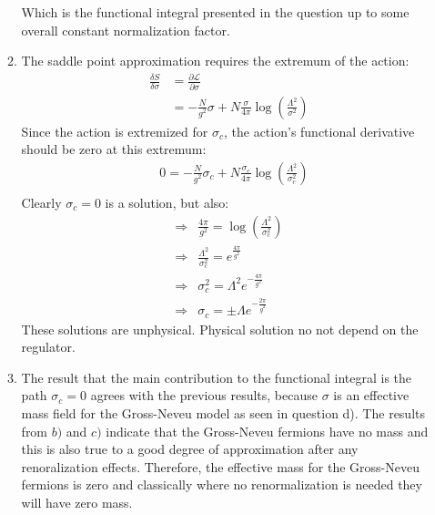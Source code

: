 \documentclass[12pt,a4]{article}
\begin{document}
\begin{enumerate}
\begin{enumerate}
        Which is the functional integral presented in the question up to some overall constant normalization factor.
      \item
        The saddle point approximation requires the extremum of the action:
        \begin{align*}
          \frac{\delta S}{\delta \sigma} &= \frac{\partial \mathcal{L}}{\partial \sigma}\\
                                         &= -\frac{N}{g^2}\sigma + N \frac{\sigma}{4 \pi}\log\left(\frac{\Lambda^2}{\sigma^2}\right)
        \end{align*}
        Since the action is extremized for $\sigma_c$, the action's functional derivative should be zero at this extremum:
        \begin{align*}
                      & 0 = -\frac{N}{g^2}\sigma_c + N \frac{\sigma_c}{4 \pi}\log\left(\frac{\Lambda^2}{\sigma^2_c}\right)\\
        \end{align*}
        Clearly $\sigma_c = 0$ is a solution, but also:
        \begin{align*}
          \Rightarrow & \frac{4 \pi}{g^2} = \log\left(\frac{\Lambda^2}{\sigma^2_c}\right)\\
          \Rightarrow & \frac{\Lambda^2}{\sigma^2_c} = e^{\frac{4 \pi}{g^2}}\\
          \Rightarrow & \sigma^2_c = \Lambda^2 e^{- \frac{4 \pi}{g^2}}\\
          \Rightarrow & \sigma_c = \pm \Lambda e^{- \frac{2 \pi}{g^2}}
        \end{align*}
        These solutions are unphysical. 
        Physical solution no not depend on the regulator.
      \item
        The result that the main contribution to the functional integral is the path $\sigma_c = 0$ agrees with the previous results, because $\sigma$ is an effective mass field for the Gross-Neveu model as seen in question d).
        The results from $b)$ and $c)$ indicate that the Gross-Neveu fermions have no mass and this is also true to a good degree of approximation after any renoralization effects.
        Therefore, the effective mass for the Gross-Neveu fermions is zero and classically where no renormalization is needed they will have zero mass.
    \end{enumerate}
\end{enumerate}
\end{document}
